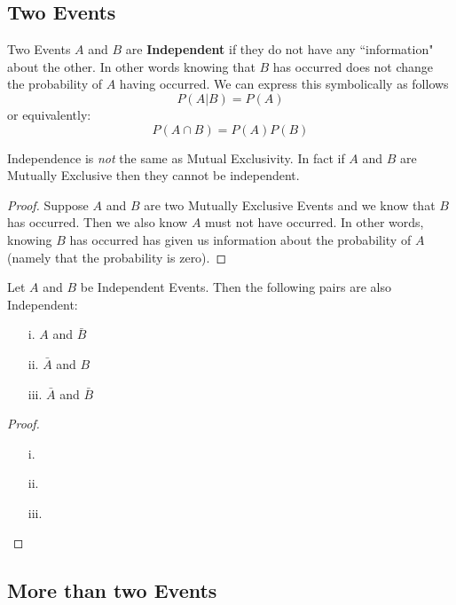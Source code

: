 \documentclass{report}
\begin{document}
\subsection{Two Events}
Two Events $A$ and $B$ are \textbf{Independent} if they do not have any ``information" about the other. In other words knowing that $B$ has occurred does not change the probability of $A$ having occurred. We can express this symbolically as follows
\[
    P(A|B)=P(A)
\]
or equivalently:
\[
    P(A\cap B)=P(A)P(B)
\]
\begin{notsofast}
    Independence is \emph{not} the same as Mutual Exclusivity. In fact if $A$ and $B$ are Mutually Exclusive then they cannot be independent. 
    \begin{proof}
        Suppose $A$ and $B$ are two Mutually Exclusive Events and we know that $B$ has occurred. Then we also know $A$ must not have occurred. In other words, knowing $B$ has occurred has given us information about the probability of $A$ (namely that the probability is zero). 
    \end{proof}
\end{notsofast}

\begin{lemma}
Let $A$ and $B$ be Independent Events. Then the following pairs are also Independent:
\begin{enumerate}
    \item[i.] $A$ and $\bar B$
    \item[ii.] $\bar A$ and $B$
    \item[iii.] $\bar A$ and $\bar B$
\end{enumerate}
\tcblower
\begin{proof}
    \begin{enumerate}
        \item[]
        \item[i.] 
        \item[ii.] 
        \item[iii.] 
    \end{enumerate}
\end{proof}
\end{lemma}

\subsection{More than two Events}

\newpage
\end{document}

